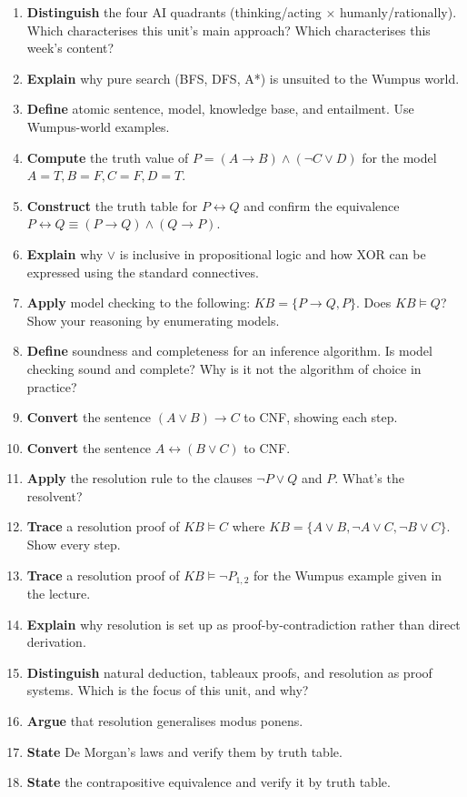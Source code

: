 \documentclass[11pt, a4paper]{article}
\begin{document}
\begin{enumerate}
  \item \textbf{Distinguish} the four AI quadrants (thinking/acting $\times$ humanly/rationally). Which characterises this unit's main approach? Which characterises this week's content?
  \item \textbf{Explain} why pure search (BFS, DFS, A*) is unsuited to the Wumpus world.
  \item \textbf{Define} atomic sentence, model, knowledge base, and entailment. Use Wumpus-world examples.
  \item \textbf{Compute} the truth value of $P = (A \rightarrow B) \land (\neg C \lor D)$ for the model $A = T, B = F, C = F, D = T$.
  \item \textbf{Construct} the truth table for $P \leftrightarrow Q$ and confirm the equivalence $P \leftrightarrow Q \equiv (P \rightarrow Q) \land (Q \rightarrow P)$.
  \item \textbf{Explain} why $\lor$ is inclusive in propositional logic and how XOR can be expressed using the standard connectives.
  \item \textbf{Apply} model checking to the following: $KB = \{P \rightarrow Q, P\}$. Does $KB \models Q$? Show your reasoning by enumerating models.
  \item \textbf{Define} soundness and completeness for an inference algorithm. Is model checking sound and complete? Why is it not the algorithm of choice in practice?
  \item \textbf{Convert} the sentence $(A \lor B) \rightarrow C$ to CNF, showing each step.
  \item \textbf{Convert} the sentence $A \leftrightarrow (B \lor C)$ to CNF.
  \item \textbf{Apply} the resolution rule to the clauses $\neg P \lor Q$ and $P$. What's the resolvent?
  \item \textbf{Trace} a resolution proof of $KB \models C$ where $KB = \{A \lor B, \neg A \lor C, \neg B \lor C\}$. Show every step.
  \item \textbf{Trace} a resolution proof of $KB \models \neg P_{1,2}$ for the Wumpus example given in the lecture.
  \item \textbf{Explain} why resolution is set up as proof-by-contradiction rather than direct derivation.
  \item \textbf{Distinguish} natural deduction, tableaux proofs, and resolution as proof systems. Which is the focus of this unit, and why?
  \item \textbf{Argue} that resolution generalises modus ponens.
  \item \textbf{State} De Morgan's laws and verify them by truth table.
  \item \textbf{State} the contrapositive equivalence and verify it by truth table.
\end{enumerate}
\end{document}
